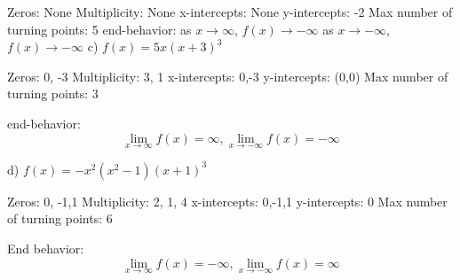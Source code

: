 \documentclass{report}
\begin{document}
      Zeros: None
      \bigbreak 
      Multiplicity: None
      \bigbreak
      x-intercepts: None
      \bigbreak
      y-intercepts: -2
      \bigbreak
      Max number of turning points: 5
      \bigbreak
      end-behavior: as $x\to\infty$, $f(x)\to-\infty$ as $x\to-\infty$, $f(x)\to
      -\infty$
      \bigbreak \bigbreak
      \noindent c) $f(x) = 5x(x+3)^3$

      Zeros: 0, -3
      \bigbreak
      Multiplicity: 3, 1
      \bigbreak
      x-intercepts: 0,-3 
      \bigbreak
      y-intercepts: (0,0)
      \bigbreak
      Max number of turning points: 3
      \bigbreak
      \begin{center}
       end-behavior:$$\lim_{x\to\infty} f(x)=\infty, \lim_{x\to-\infty} f(x) = -\infty$$
      \end{center}

    \bigbreak \bigbreak
    \noindent d) $f(x) = -x^2(x^2-1)(x+1)^3$

    Zeros: 0, -1,1
    \bigbreak
    Multiplicity: 2, 1, 4
    \bigbreak
    x-intercepts: 0,-1,1
    \bigbreak
    y-intercepts: 0
    \bigbreak
    Max number of turning points: 6
    \bigbreak
    \begin{center}
      End behavior: $$\lim_{x\to\infty} f(x) = -\infty, \lim_{x\to-\infty} f(x) = \infty$$
      
    \end{center}
      

      


  
\end{document}
